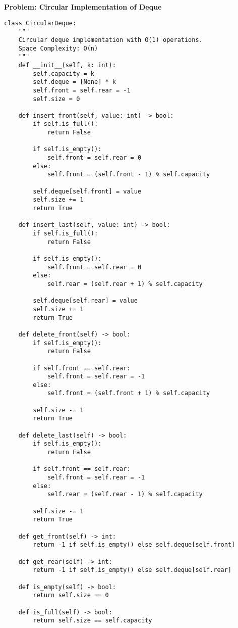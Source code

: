 \noindent\textbf{Problem: Circular Implementation of Deque}
\begin{verbatim}
class CircularDeque:
    """
    Circular deque implementation with O(1) operations.
    Space Complexity: O(n)
    """
    def __init__(self, k: int):
        self.capacity = k
        self.deque = [None] * k
        self.front = self.rear = -1
        self.size = 0

    def insert_front(self, value: int) -> bool:
        if self.is_full():
            return False
            
        if self.is_empty():
            self.front = self.rear = 0
        else:
            self.front = (self.front - 1) % self.capacity
            
        self.deque[self.front] = value
        self.size += 1
        return True

    def insert_last(self, value: int) -> bool:
        if self.is_full():
            return False
            
        if self.is_empty():
            self.front = self.rear = 0
        else:
            self.rear = (self.rear + 1) % self.capacity
            
        self.deque[self.rear] = value
        self.size += 1
        return True

    def delete_front(self) -> bool:
        if self.is_empty():
            return False
            
        if self.front == self.rear:
            self.front = self.rear = -1
        else:
            self.front = (self.front + 1) % self.capacity
            
        self.size -= 1
        return True

    def delete_last(self) -> bool:
        if self.is_empty():
            return False
            
        if self.front == self.rear:
            self.front = self.rear = -1
        else:
            self.rear = (self.rear - 1) % self.capacity
            
        self.size -= 1
        return True

    def get_front(self) -> int:
        return -1 if self.is_empty() else self.deque[self.front]

    def get_rear(self) -> int:
        return -1 if self.is_empty() else self.deque[self.rear]

    def is_empty(self) -> bool:
        return self.size == 0

    def is_full(self) -> bool:
        return self.size == self.capacity
\end{verbatim}

